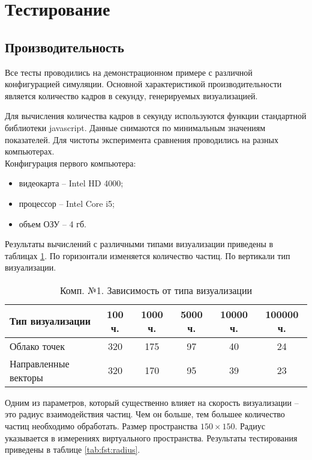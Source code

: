 \newpage
\section{Тестирование}

\subsection{Производительность}

Все тесты проводились на демонстрационном примере с различной конфигурацией
симуляции. Основной характеристикой производительности является количество 
кадров в секунду, генерируемых визуализацией.

Для вычисления количества кадров в секунду используются функции стандартной 
библиотеки javascript. Данные снимаются по минимальным значениям показателей.
Для чистоты эксперимента сравнения проводились на разных компьютерах. \\

Конфигурация первого компьютера:

\begin{itemize}
  \item видеокарта -- Intel HD 4000;
  \item процессор -- Intel Core i5;
  \item объем ОЗУ -- 4 гб.
\end{itemize}

Результаты вычислений с различными типами визуализации приведены 
в таблицах \ref{tab:fst:simple}. По горизонтали изменяется количество частиц.
По вертикали тип визуализации.

\begin{table}[H]
  \caption{\label{tab:fst:simple}Комп. №1. Зависимость от типа визуализации}
  \begin{center}
    \begin{tabular}{|l|c|c|c|c|c|}
      \hline
      Тип визуализации & 100 ч. & 1000 ч. & 5000 ч. & 10000 ч. & 100000 ч. \\
      \hline
      Облако точек & 320 & 175 & 97 & 40 & 24 \\
      Направленные векторы & 320 & 170 & 95 & 39 & 23 \\
      \hline
    \end{tabular}
  \end{center}
\end{table}

Одним из параметров, который существенно влияет на скорость визуализации -- это
радиус взаимодействия частиц. Чем он больше, тем большее количество частиц необходимо
обработать. Размер пространства $150\times150$. Радиус указывается в измерениях
виртуального пространства. Результаты тестирования приведены в таблице \ref{tab:fst:radius}.

